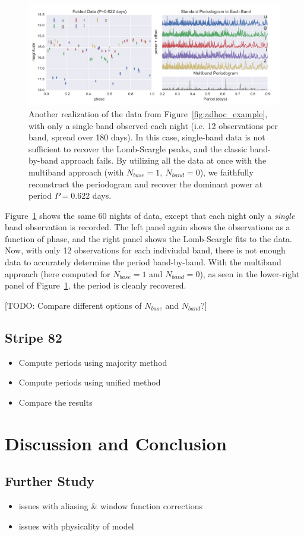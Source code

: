 \documentclass[12pt,preprint]{aastex}
\newcommand{\todo}[1]{{\color{red} [TODO: #1]}}
\newcommand{\Fig}[1]{Figure~\ref{fig:#1}}
\newcommand{\fig}[1]{\Fig{#1}}
\newcommand{\figlabel}[1]{\label{fig:#1}}
\begin{document}
\begin{figure}
  \centering
  \includegraphics[width=\textwidth]{fig05.pdf}
  \caption{
    Another realization of the data from \fig{adhoc_example}, with only a single
    band observed each night (i.e. 12 observations per band, spread over 180
    days). In this case, single-band data is not sufficient to recover the
    Lomb-Scargle peaks, and the classic band-by-band approach fails.
    By utilizing all the data at once with the multiband approach
    (with $N_{base}=1,~N_{band}=0$),
    we faithfully reconstruct the periodogram and recover
    the dominant power at period $P=0.622$ days.
  } 
  \figlabel{multi_example}
\end{figure}

\fig{multi_example} shows the same 60 nights of data, except that each night only a {\it single} band observation is recorded. The left panel again shows the observations as a function of phase, and the right panel shows the Lomb-Scargle fits to the data. Now, with only 12 observations for each indiviudal band, there is not enough data to accurately determine the period band-by-band. With the multiband approach (here computed for $N_{base}=1$ and $N_{band}=0$), as seen in the lower-right panel of \fig{multi_example}, the period is cleanly recovered.


\todo{Compare different options of $N_{base}$ and $N_{band}$?}


\subsection{Stripe 82}

\begin{itemize}
  \item Compute periods using majority method
  \item Compute periods using unified method
  \item Compare the results
\end{itemize}

\section{Discussion and Conclusion}

\subsection{Further Study}
\begin{itemize}
  \item issues with aliasing \& window function corrections
  \item issues with physicality of model
\end{itemize}





\end{document}
